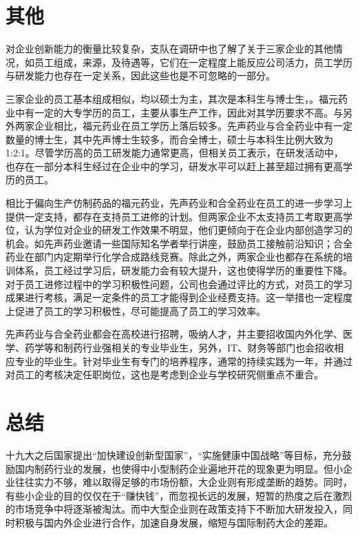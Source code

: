 \documentclass[twocolumn]{ctexbook}
\begin{document}
			\section{其他}
			对企业创新能力的衡量比较复杂，支队在调研中也了解了关于三家企业的其他情况，如员工组成，来源，及待遇等，它们在一定程度上能反应公司活力，员工学历与研发能力也存在一定关系，因此这些也是不可忽略的一部分。
			
			三家企业的员工基本组成相似，均以硕士为主，其次是本科生与博士生，。福元药业中有一定的大专学历的员工，主要从事生产工作，因此对其学历要求不高。与另外两家企业相比，福元药业在员工学历上落后较多。先声药业与合全药业中有一定数量的博士生，其中先声博士生较多，而合全博士，硕士与本科生比例大致为1:2:1。尽管学历高的员工研发能力通常更高，但相关员工表示，在研发活动中，也存在一部分本科生经过在企业中的学习，研发水平可以赶上甚至超过拥有更高学历的员工。
			
			相比于偏向生产仿制药品的福元药业，先声药业和合全药业在员工的进一步学习上提供一定支持，都存在支持员工进修的计划。但两家企业不太支持员工考取更高学位，认为学位对企业的研发工作效果不明显，他们更倾向于在企业内部创造学习的机会。如先声药业邀请一些国际知名学者举行讲座，鼓励员工接触前沿知识；合全药业在部门内定期举行化学合成路线竞赛。除此之外，两家企业也都存在系统的培训体系，员工经过学习后，研发能力会有较大提升，这也使得学历的重要性下降。对于员工进修过程中的学习积极性问题，公司也会通过评比的方式，对员工的学习成果进行考核，满足一定条件的员工才能得到企业经费支持。这一举措也一定程度上促进了员工的学习积极性，尽可能提高了员工的学习效率。
			
			先声药业与合全药业都会在高校进行招聘，吸纳人才，并主要招收国内外化学、医学、药学等和制药行业强相关的专业毕业生，另外，IT、财务等部门也会招收相应专业的毕业生。针对毕业生有专门的培养程序，通常的持续实践为一年，并通过对员工的考核决定任职岗位，这也是考虑到企业与学校研究侧重点不重合。
			
	
	
\section{总结}
	十九大之后国家提出“加快建设创新型国家”，“实施健康中国战略”等目标，充分鼓励国内制药行业的发展\citep{RN38}，也使得中小型制药企业遍地开花的现象更为明显。但小企业往往实力不够，难以取得足够的市场份额，大企业则有形成垄断的趋势。同时，有些小企业的目的仅仅在于“赚快钱”，而忽视长远的发展，短暂的热度之后在激烈的市场竞争中将逐渐被淘汰。而中大型企业则在政策支持下不断加大研发投入，同时积极与国内外企业进行合作，加速自身发展，缩短与国际制药大企的差距。
	
\end{document}
